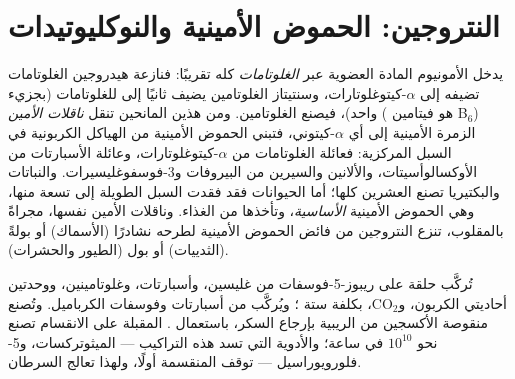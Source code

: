\section{النتروجين: الحموض الأمينية والنوكليوتيدات}

\begin{definition}\label{def:b1:biosyntheses-integration:nitrogen}
يدخل الأمونيوم المادة العضوية عبر \emph{الغلوتامات} كله تقريبًا:
فنازعة هيدروجين الغلوتامات تضيفه إلى $\alpha$-كيتوغلوتارات، وسنتيتاز
الغلوتامين يضيف ثانيًا إلى  للغلوتامات (بجزيء  واحد)،
فيصنع الغلوتامين. ومن هذين المانحين تنقل \emph{ناقلات الأمين}
( هو فيتامين B$_6$) الزمرة الأمينية إلى أي 
$\alpha$-كيتوني، فتبني الحموض الأمينية من الهياكل الكربونية في السبل
المركزية: فعائلة الغلوتامات من $\alpha$-كيتوغلوتارات، وعائلة
الأسبارتات من الأوكسالوأسيتات، والألانين والسيرين من البيروفات
و3-فوسفوغليسيرات. والنباتات والبكتيريا تصنع العشرين كلها؛ أما
الحيوانات فقد فقدت السبل الطويلة إلى تسعة منها، وهي الحموض الأمينية
\emph{الأساسية}، وتأخذها من الغذاء. وناقلات الأمين نفسها، مجراةً
بالمقلوب، تنزع النتروجين من فائض الحموض الأمينية لطرحه نشادرًا
(الأسماك) أو بولةً (الثدييات) أو  بول (الطيور والحشرات).
\end{definition}

\begin{example}[النوكليوتيدات]\label{ex:b1:biosyntheses-integration:nucleotides}
تُركَّب حلقة  على ريبوز-5-فوسفات من غليسين، وأسبارتات،
وغلوتامينين، ووحدتين أحاديتي الكربون، و$\mathrm{CO_2}$، بكلفة ستة
؛ ويُركَّب  من أسبارتات وفوسفات الكرباميل. وتُصنع
 منقوصة الأكسجين من  الريبية بإرجاع السكر،
باستعمال .  المقبلة على الانقسام تصنع نحو $10^{10}$
 في ساعة؛ والأدوية التي تسد هذه التراكيب --- الميثوتركسات،
و5-فلورويوراسيل --- توقف  المنقسمة أولًا، ولهذا تعالج السرطان.
\end{example}

